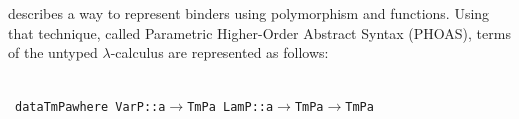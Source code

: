 \documentclass[9pt,authoryear]{sigplanconf}
\begin{document}
%
\citet{chlipala_parametric_2008} describes a way to represent binders
    using polymorphism and functions. Using that technique, called
    Parametric Higher-Order Abstract Syntax (PHOAS), terms of the
    untyped $ \lambda $-calculus are represented as follows{:}%


{\nopagebreak }

%
%
%
%
~\\~\vphantom{$\{$}\texttt{data}\texttt{\mbox{\hspace{0.50em}}}\texttt{TmP}\texttt{\mbox{\hspace{0.50em}}}\texttt{a}\texttt{\mbox{\hspace{0.50em}}}\texttt{where}\texttt{{\nopagebreak \newline%
}\vphantom{$\{$}}\texttt{\mbox{\hspace{0.50em}}}\texttt{\mbox{\hspace{0.50em}}}\texttt{VarP}\texttt{\mbox{\hspace{0.50em}}}\texttt{{:}{:}}\texttt{\mbox{\hspace{0.50em}}}\texttt{a}\texttt{\mbox{\hspace{0.50em}}}\texttt{$ \rightarrow $}\texttt{\mbox{\hspace{0.50em}}}\texttt{TmP}\texttt{\mbox{\hspace{0.50em}}}\texttt{a}\texttt{{\nopagebreak \newline%
}\vphantom{$\{$}}\texttt{\mbox{\hspace{0.50em}}}\texttt{\mbox{\hspace{0.50em}}}\texttt{LamP}\texttt{\mbox{\hspace{0.50em}}}\texttt{{:}{:}}\texttt{\mbox{\hspace{0.50em}}}\texttt{\makebox[1.22ex][l]{$ {(} $}}\texttt{a}\texttt{\mbox{\hspace{0.50em}}}\texttt{$ \rightarrow $}\texttt{\mbox{\hspace{0.50em}}}\texttt{TmP}\texttt{\mbox{\hspace{0.50em}}}\texttt{a}\texttt{\makebox[1.22ex][r]{$ {)} $}}\texttt{\mbox{\hspace{0.50em}}}\texttt{$ \rightarrow $}\texttt{\mbox{\hspace{0.50em}}}\texttt{TmP}\texttt{\mbox{\hspace{0.50em}}}\texttt{a}\texttt{{\nopagebreak \newline%
}}
\end{document}
